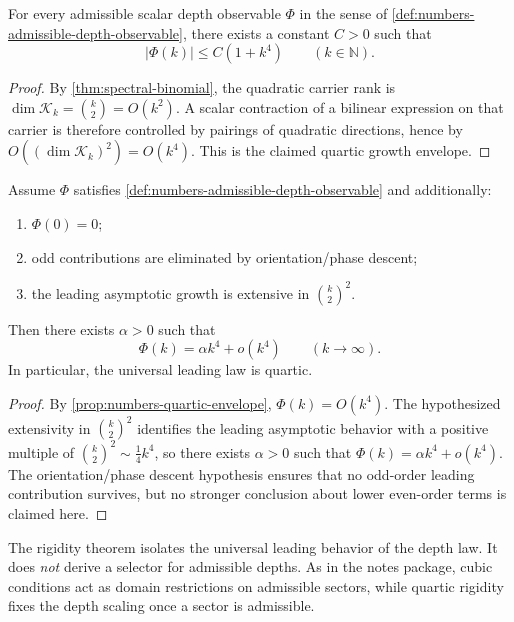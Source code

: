\begin{proposition}
\label{prop:numbers-quartic-envelope}
For every admissible scalar depth observable
\(\Phi\) in the sense of
\cref{def:numbers-admissible-depth-observable}, there exists a
constant \(C>0\) such that
\[
  |\Phi(k)|\le C(1+k^4)
  \qquad (k\in\mathbb N).
\]
\end{proposition}

\begin{proof}
By \cref{thm:spectral-binomial}, the quadratic carrier rank is
\(\dim\mathcal K_k=\binom{k}{2}=O(k^2)\). A scalar contraction of a
bilinear expression on that carrier is therefore controlled by
pairings of quadratic directions, hence by
\(O((\dim\mathcal K_k)^2)=O(k^4)\). This is the claimed quartic
growth envelope.
\end{proof}

\begin{theorem}
\label{thm:numbers-pure-quartic-rigidity}
Assume \(\Phi\) satisfies
\cref{def:numbers-admissible-depth-observable} and additionally:
\begin{enumerate}[label=\textup{(\roman*)}]
\item \(\Phi(0)=0\);
\item odd contributions are eliminated by orientation/phase descent;
\item the leading asymptotic growth is extensive in
      \(\binom{k}{2}^2\).
\end{enumerate}
Then there exists \(\alpha>0\) such that
\[
  \Phi(k)=\alpha k^4+o(k^4)
  \qquad (k\to\infty).
\]
In particular, the universal leading law is quartic.
\end{theorem}

\begin{proof}
By \cref{prop:numbers-quartic-envelope}, \(\Phi(k)=O(k^4)\). The
hypothesized extensivity in \(\binom{k}{2}^2\) identifies the leading
asymptotic behavior with a positive multiple of
\(\binom{k}{2}^2\sim \tfrac14 k^4\), so there exists \(\alpha>0\)
such that \(\Phi(k)=\alpha k^4+o(k^4)\). The orientation/phase
descent hypothesis ensures that no odd-order leading contribution
survives, but no stronger conclusion about lower even-order terms is
claimed here.
\end{proof}

\begin{remark}
\label{rem:numbers-rigidity-vs-selector}
The rigidity theorem isolates the universal leading behavior of the
depth law.
It does \emph{not} derive a selector for admissible depths.
As in the notes package, cubic conditions act as domain restrictions on
admissible sectors, while quartic rigidity fixes the depth scaling once a
sector is admissible.
\end{remark}

